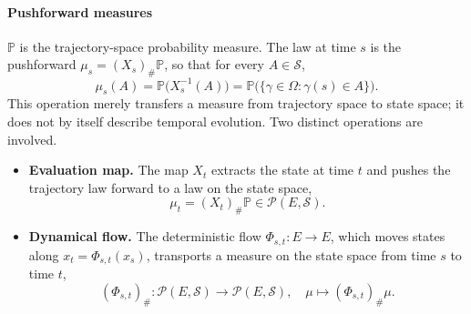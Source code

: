 \documentclass[12pt,a4paper,oneside]{book}
\begin{document}
\paragraph{Pushforward measures}

$\mathbb P$ is the trajectory-space probability measure. The law at time $s$ is the pushforward $\mu_s=(X_s)_\#\mathbb P$, so that for every
$A\in\mathcal S$,
\begin{equation*}
    \mu_s(A)=\mathbb P\bigl(X_s^{-1}(A)\bigr)
           =\mathbb P\bigl(\{\gamma\in\Omega:\gamma(s)\in A\}\bigr).
\end{equation*}
This operation merely transfers a measure from trajectory space to state space; it does not by itself describe temporal
evolution. Two distinct operations are involved.

\begin{itemize}
    \item \textbf{Evaluation map.} The map $X_t$ extracts the state at time $t$ and pushes the trajectory law forward to 
        a law on the state space,
        \begin{equation*}
            \mu_t=(X_t)_\#\mathbb P\in\mathcal P(E,\mathcal S).
        \end{equation*}

    \item \textbf{Dynamical flow.} The deterministic flow $\Phi_{s,t}:E\to E$, which moves states along
        $x_t=\Phi_{s,t}(x_s)$, transports a measure on the state space from time $s$ to time $t$,
        \begin{equation*}
            (\Phi_{s,t})_\#:\mathcal P(E,\mathcal S)\to\mathcal P(E,\mathcal S),\quad
            \mu\mapsto(\Phi_{s,t})_\#\mu .
        \end{equation*}
\end{itemize}
\end{document}
